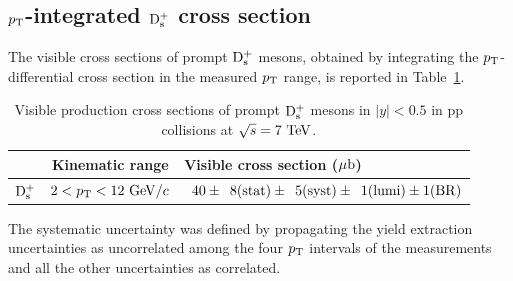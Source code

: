 \subsection{$p_{\rm T}$-integrated ${\rm D_s^+}$ cross section}
\label{sec:ppDsXsecPtint}
The visible cross sections of prompt ${\rm D_s^+}$ mesons, obtained by integrating
the $p_{\rm T}$-differential cross section in the measured $p_{\rm T}$ range, is reported
in Table~\ref{tab:ptintegcs}.
\begin{table}[!h]
\centering
\begin{tabular}{c|c|l} 
 & Kinematic range & Visible cross section ($\mathrm{\mu b}$) \\
\hline
\rule{0pt}{12pt} 
${\rm D_s^+}$     & $2<p_{\rm T}<12~\mathrm{GeV}/c$ & $\phantom{0}40 \pm \phantom{0}8 ({\rm stat}) \pm \phantom{0}5 ({\rm syst}) \pm \phantom{0}1 ({\rm lumi}) \pm 1 ({\rm BR})$\\[1ex]
\hline
\end{tabular}
\caption{Visible production cross sections of prompt ${\rm D_s^+}$ mesons in $|y| < 0.5$ in pp collisions at $\sqrt{s} = 7~\mathrm{TeV}$.}
\label{tab:ptintegcs}
\end{table}
The systematic uncertainty was defined by propagating the yield extraction 
uncertainties as uncorrelated among the four $p_{\rm T}$ intervals of the measurements and all the other uncertainties 
as correlated.

